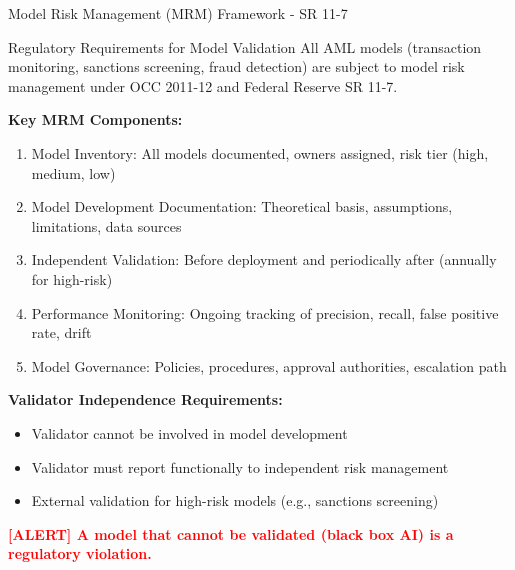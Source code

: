 \documentclass[11pt,a4paper]{beamer}
\newcommand{\redflag}[1]{\textcolor{red}{\textbf{[ALERT] #1}}}
\begin{document}
	\begin{frame}{Model Risk Management (MRM) Framework - SR 11-7}
		\begin{block}{Regulatory Requirements for Model Validation}
			All AML models (transaction monitoring, sanctions screening, fraud detection) are subject to model risk management under OCC 2011-12 and Federal Reserve SR 11-7.
		\end{block}
		
		\textbf{Key MRM Components:}
		\begin{enumerate}
			\item Model Inventory: All models documented, owners assigned, risk tier (high, medium, low)
			\item Model Development Documentation: Theoretical basis, assumptions, limitations, data sources
			\item Independent Validation: Before deployment and periodically after (annually for high-risk)
			\item Performance Monitoring: Ongoing tracking of precision, recall, false positive rate, drift
			\item Model Governance: Policies, procedures, approval authorities, escalation path
		\end{enumerate}
		
		\textbf{Validator Independence Requirements:}
		\begin{itemize}
			\item Validator cannot be involved in model development
			\item Validator must report functionally to independent risk management
			\item External validation for high-risk models (e.g., sanctions screening)
		\end{itemize}
		
		\redflag{A model that cannot be validated (black box AI) is a regulatory violation.}
	\end{frame}
	
\end{document}
